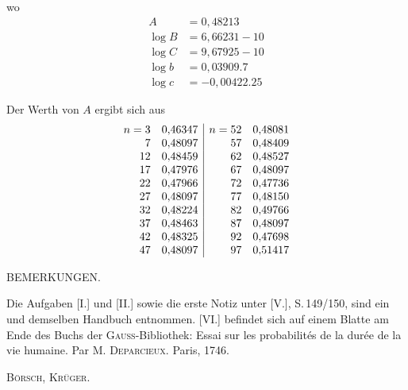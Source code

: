 wo
\[
\begin{array}{rl}
A &= 0{,}48213\\
\log B &= 6{,}66231 - 10\\
\log C &= 9{,}67925 - 10\\
\log b &= 0{,}03909.7 \\
\log c &= -0{,}00422.25
\end{array}
\]


Der Werth von $A$ ergibt sich aus
\[
\begin{array}{r@{\quad}l|r@{\quad}l}
n=3 & 0{,}46347 & n=52 & 0{,}48081\\
7 & 0{,}48097 & 57 & 0{,}48409\\
12 & 0{,}48459 & 62 & 0{,}48527\\
17 & 0{,}47976 & 67 & 0{,}48097\\
22 & 0{,}47966 & 72 & 0{,}47736\\
27 & 0{,}48097 & 77 & 0{,}48150\\
32 & 0{,}48224 & 82 & 0{,}49766\\
37 & 0{,}48463 & 87 & 0{,}48097\\
42 & 0{,}48325 & 92 & 0{,}47698\\
47 & 0{,}48097 & 97 & 0{,}51417
\end{array}
\]

\begin{center}
BEMERKUNGEN.
\end{center}

Die Aufgaben [I.] und [II.] sowie die erste Notiz unter [V.], S.\,149/150, sind ein und demselben Handbuch entnommen. [VI.] befindet sich auf einem Blatte am Ende des Buchs der \textsc{Gauss}-Bibliothek: Essai sur les probabilités de la durée de la vie humaine. Par M. \textsc{Deparcieux}. Paris, 1746.

\hfill \textsc{Börsch}, \textsc{Krüger}.
